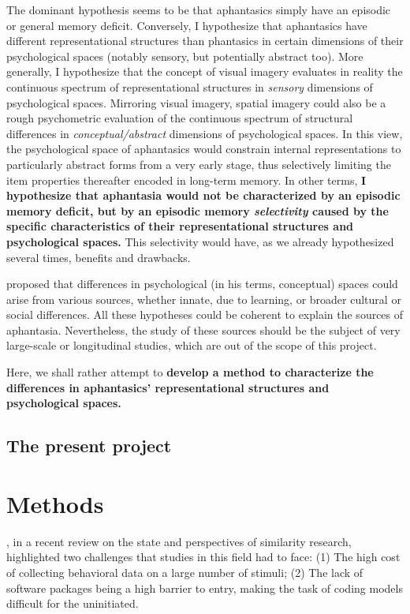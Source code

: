 \documentclass[
  authoryear]{elsarticle}
\begin{document}
The dominant hypothesis seems to be that aphantasics simply have an
episodic or general memory deficit. Conversely, I hypothesize that
aphantasics have different representational structures than phantasics
in certain dimensions of their psychological spaces (notably sensory,
but potentially abstract too). More generally, I hypothesize that the
concept of visual imagery evaluates in reality the continuous spectrum
of representational structures in \emph{sensory} dimensions of
psychological spaces. Mirroring visual imagery, spatial imagery could
also be a rough psychometric evaluation of the continuous spectrum of
structural differences in \emph{conceptual/abstract} dimensions of
psychological spaces. In this view, the psychological space of
aphantasics would constrain internal representations to particularly
abstract forms from a very early stage, thus selectively limiting the
item properties thereafter encoded in long-term memory. In other terms,
\textbf{I hypothesize that aphantasia would not be characterized by an
episodic memory deficit, but by an episodic memory \emph{selectivity}
caused by the specific characteristics of their representational
structures and psychological spaces.} This selectivity would have, as we
already hypothesized several times, benefits and drawbacks.

\citet{gardenforsConceptualSpacesFramework2004} proposed that
differences in psychological (in his terms, conceptual) spaces could
arise from various sources, whether innate, due to learning, or broader
cultural or social differences. All these hypotheses could be coherent
to explain the sources of aphantasia. Nevertheless, the study of these
sources should be the subject of very large-scale or longitudinal
studies, which are out of the scope of this project.

Here, we shall rather attempt to \textbf{develop a method to
characterize the differences in aphantasics' representational structures
and psychological spaces.}

\subsection{The present project}\label{the-present-project}

\section{Methods}\label{methods}

\citet{roads2024}, in a recent review on the state and perspectives of
similarity research, highlighted two challenges that studies in this
field had to face: (1) The high cost of collecting behavioral data on a
large number of stimuli; (2) The lack of software packages being a high
barrier to entry, making the task of coding models difficult for the
uninitiated.
\end{document}
